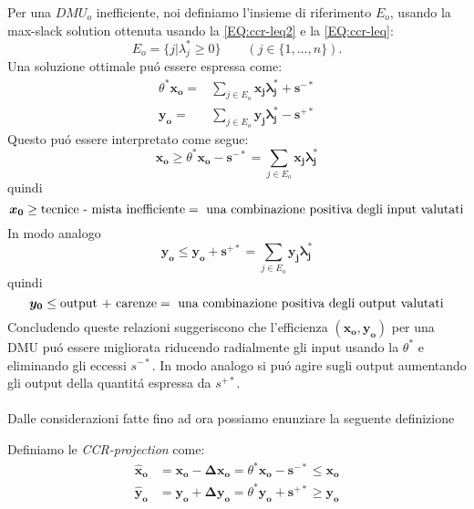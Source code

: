 \begin{oss} Per una $DMU_{o}$ inefficiente, noi definiamo l'insieme di riferimento $E_{o}$, usando la max-slack solution ottenuta usando la \ref{EQ:ccr-leq2} e la \ref{EQ:ccr-leq}:
\begin{equation}
E_{o} = \lbrace j| \lambda_{j}^* \geq 0\rbrace \qquad (j\in \lbrace1, \dots, n\rbrace).
\end{equation}
Una soluzione ottimale pu\'o essere espressa come:
\begin{equation}
\begin{split}
\theta^*\boldsymbol{x_{o}} = & \sum_{j \in E_{o}} \boldsymbol{x_{j}\lambda^*_{j} + s^{-*}} \\
\boldsymbol{y_{o}} = & \sum_{j \in E_{o}} \boldsymbol{y_{j}\lambda^*_{j} - s^{+*}}
\end{split}
\end{equation}
Questo pu\'o essere interpretato come segue:
\begin{equation}
\boldsymbol{x_{o}} \geq \theta^* \boldsymbol{x_{o} - s^{-*}} = \sum_{j \in E_{o}} \boldsymbol{x_{j}\lambda^*_{j}}
\end{equation}
quindi
\begin{equation}
\boldsymbol{x_0} \geq \text{tecnice - mista inefficiente} \\
= \text{ una combinazione positiva degli input valutati}
\end{equation}
In modo analogo 
\begin{equation}
\boldsymbol{y_{o}} \leq \boldsymbol{y_{o} + s^{+*}} = \sum_{j \in E_{o}} \boldsymbol{y_{j}\lambda^*_{j}}
\end{equation}
quindi
\begin{equation}
\boldsymbol{y_0} \leq \text{output + carenze} \\
= \text{ una combinazione positiva degli output valutati}
\end{equation}
Concludendo queste relazioni suggeriscono che l'efficienza $(\boldsymbol{x_{o}, y_{o}})$ per una DMU pu\'o essere migliorata riducendo radialmente gli input usando la $\theta^*$ e eliminando gli eccessi $s^{-*}$. In modo analogo si pu\'o agire sugli output aumentando gli output della quantit\'a espressa da $s^{+*}$.
\end{oss}
\paragraph{} Dalle considerazioni fatte fino  ad ora possiamo enunziare la seguente definizione
\begin{definiz} Definiamo le \emph{CCR-projection} come:
\begin{equation}
\begin{split}
\boldsymbol{\hat{x}_{o}} & = \boldsymbol{x_o - \Delta x_{o}} = \theta^*\boldsymbol{x_o - s^{-*}} \leq \boldsymbol{x_o} \\
\boldsymbol{\hat{y}_{o}} & = \boldsymbol{y_o + \Delta y_{o}} = \theta^*\boldsymbol{y_o + s^{+*}} \geq \boldsymbol{y_o} 
\end{split}
\end{equation}
\end{definiz}
